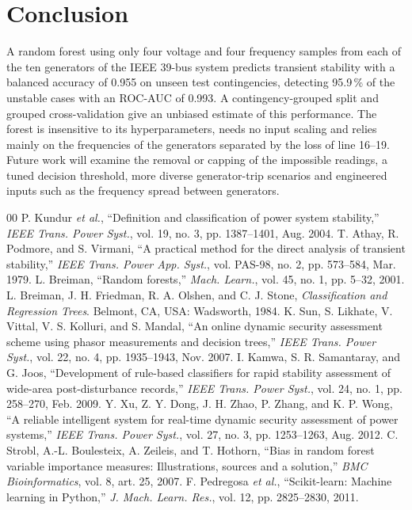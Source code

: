 \documentclass[conference]{IEEEtran}
\begin{document}
\section{Conclusion}
A random forest using only four voltage and four frequency samples from each of the ten generators of the IEEE 39-bus
system predicts transient stability with a balanced accuracy of 0.955 on unseen test contingencies, detecting 95.9\,\%
of the unstable cases with an ROC-AUC of 0.993. A contingency-grouped split and grouped cross-validation give an
unbiased estimate of this performance. The forest is insensitive to its hyperparameters, needs no input scaling and
relies mainly on the frequencies of the generators separated by the loss of line 16--19. Future work will examine the
removal or capping of the impossible readings, a tuned decision threshold, more diverse generator-trip scenarios and
engineered inputs such as the frequency spread between generators.

\begin{thebibliography}{00}
 P. Kundur \textit{et al.}, ``Definition and classification of power system stability,''
\textit{IEEE Trans. Power Syst.}, vol. 19, no. 3, pp. 1387--1401, Aug. 2004.
 T. Athay, R. Podmore, and S. Virmani, ``A practical method for the direct analysis of transient
stability,'' \textit{IEEE Trans. Power App. Syst.}, vol. PAS-98, no. 2, pp. 573--584, Mar. 1979.
 L. Breiman, ``Random forests,'' \textit{Mach. Learn.}, vol. 45, no. 1, pp. 5--32, 2001.
 L. Breiman, J. H. Friedman, R. A. Olshen, and C. J. Stone, \textit{Classification and Regression
Trees}. Belmont, CA, USA: Wadsworth, 1984.
 K. Sun, S. Likhate, V. Vittal, V. S. Kolluri, and S. Mandal, ``An online dynamic security assessment
scheme using phasor measurements and decision trees,'' \textit{IEEE Trans. Power Syst.}, vol. 22, no. 4,
pp. 1935--1943, Nov. 2007.
 I. Kamwa, S. R. Samantaray, and G. Joos, ``Development of rule-based classifiers for rapid
stability assessment of wide-area post-disturbance records,'' \textit{IEEE Trans. Power Syst.}, vol. 24, no. 1,
pp. 258--270, Feb. 2009.
 Y. Xu, Z. Y. Dong, J. H. Zhao, P. Zhang, and K. P. Wong, ``A reliable intelligent system for real-time
dynamic security assessment of power systems,'' \textit{IEEE Trans. Power Syst.}, vol. 27, no. 3, pp. 1253--1263,
Aug. 2012.
 C. Strobl, A.-L. Boulesteix, A. Zeileis, and T. Hothorn, ``Bias in random forest variable
importance measures: Illustrations, sources and a solution,'' \textit{BMC Bioinformatics}, vol. 8, art. 25, 2007.
 F. Pedregosa \textit{et al.}, ``Scikit-learn: Machine learning in Python,''
\textit{J. Mach. Learn. Res.}, vol. 12, pp. 2825--2830, 2011.
\end{thebibliography}
\end{document}
